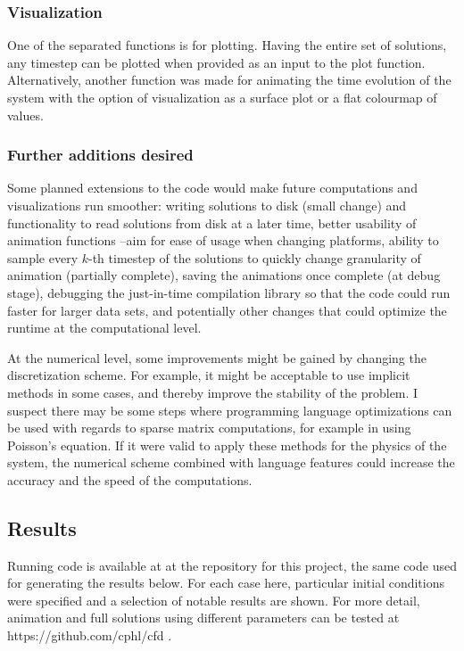 \documentclass[11pt]{article}
\begin{document}
{\subsubsection{Visualization}
One of the separated functions is for plotting. Having the entire set of solutions, any
timestep can be plotted when provided as an input to the plot function. Alternatively,
another function was made for animating the time evolution of the system with the option
of visualization as a surface plot or a flat colourmap of values.

\subsubsection{Further additions desired}
Some planned extensions to the code would make future computations and visualizations
run smoother: writing solutions to disk (small change) and functionality to read solutions
from disk at a later time, better usability of animation functions --aim for ease of usage
when changing platforms, ability to sample every $k$-th timestep of the solutions to
quickly change granularity of animation (partially complete), saving the animations once
complete (at debug stage), debugging the just-in-time compilation library so that the code
could run faster for larger data sets, and potentially other changes that could optimize the
runtime at the computational level.

At the numerical level, some improvements might be gained by changing the discretization
scheme. For example, it might be acceptable to use implicit methods in some cases, and thereby
improve the stability of the problem. I suspect there may be some steps where programming
language optimizations can be used with regards to sparse matrix computations, for example
in using Poisson's equation. If it were valid to apply these methods for the physics of the
system, the numerical scheme combined with language features could increase the accuracy and
the speed of the computations.

\subsection{Results}

Running code is available at at the repository for this project, the same code used for
generating the results below. For each case here, particular initial conditions were specified
and a selection of notable results are shown. For more detail, animation and full solutions
using different parameters can be tested at https://github.com/cphl/cfd .


}
\end{document}
